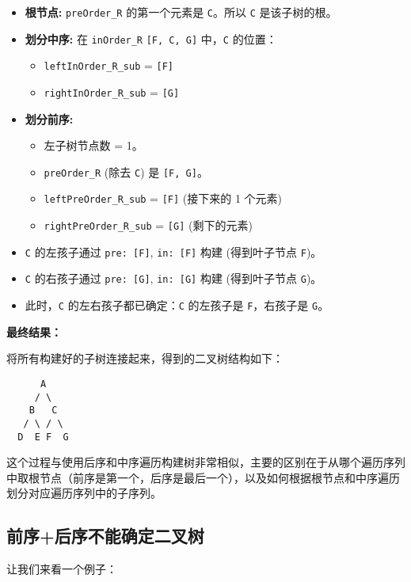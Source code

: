 \begin{enumerate}
\begin{itemize}
		\item \textbf{根节点:} \lstinline{preOrder_R} 的第一个元素是 \lstinline{C}。所以 \lstinline{C} 是该子树的根。
		\item \textbf{划分中序:} 在 \lstinline{inOrder_R} \lstinline{[F, C, G]} 中，\lstinline{C} 的位置：
		\begin{itemize}
			\item \lstinline{leftInOrder_R_sub} = \lstinline{[F]}
			\item \lstinline{rightInOrder_R_sub} = \lstinline{[G]}
		\end{itemize}
		\item \textbf{划分前序:}
		\begin{itemize}
			\item 左子树节点数 = 1。
			\item \lstinline{preOrder_R} (除去 \lstinline{C}) 是 \lstinline{[F, G]}。
			\item \lstinline{leftPreOrder_R_sub} = \lstinline{[F]} (接下来的 1 个元素)
			\item \lstinline{rightPreOrder_R_sub} = \lstinline{[G]} (剩下的元素)
		\end{itemize}
		\item \lstinline{C} 的左孩子通过 \lstinline{pre: [F]}, \lstinline{in: [F]} 构建 (得到叶子节点 \lstinline{F})。
		\item \lstinline{C} 的右孩子通过 \lstinline{pre: [G]}, \lstinline{in: [G]} 构建 (得到叶子节点 \lstinline{G})。
		\item 此时，\lstinline{C} 的左右孩子都已确定：\lstinline{C} 的左孩子是 \lstinline{F}，右孩子是 \lstinline{G}。
	\end{itemize}
\end{enumerate}

\textbf{最终结果：}

将所有构建好的子树连接起来，得到的二叉树结构如下：

\begin{lstlisting}
      A
     / \
    B   C
   / \ / \
  D  E F  G
\end{lstlisting}
这个过程与使用后序和中序遍历构建树非常相似，主要的区别在于从哪个遍历序列中取根节点（前序是第一个，后序是最后一个），以及如何根据根节点和中序遍历划分对应遍历序列中的子序列。

\subsection{前序+后序不能确定二叉树}

让我们来看一个例子：

